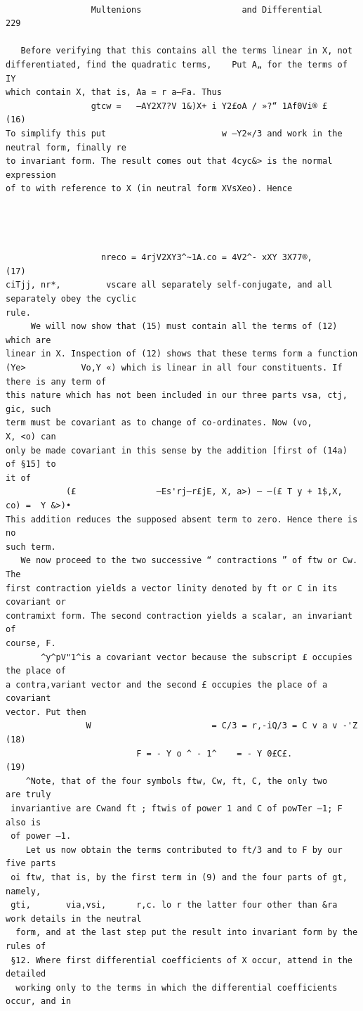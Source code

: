 \documentclass[10pt]{article}
\begin{document}
\clearpage
\begin{verbatim}

                 Multenions                    and Differential                  229

   Before verifying that this contains all the terms linear in X, not
differentiated, find the quadratic terms,    Put A„ for the terms of IY
which contain X, that is, Aa = r a—Fa. Thus
                 gtcw =   —AY2X7?V 1&)X+ i Y2£oA / »?“ 1Af0Vi® £                 (16)
To simplify this put                       w —Y2«/3 and work in the neutral form, finally re
to invariant form. The result comes out that 4cyc&> is the normal expression
of to with reference to X (in neutral form XVsXeo). Hence




                   nreco = 4rjV2XY3^~1A.co = 4V2^- xXY 3X77®,                    (17)
ciTjj, nr*,         vscare all separately self-conjugate, and all separately obey the cyclic
rule.
     We will now show that (15) must contain all the terms of (12) which are
linear in X. Inspection of (12) shows that these terms form a function
(Ye>           Vo,Y «) which is linear in all four constituents. If there is any term of
this nature which has not been included in our three parts vsa, ctj, gic, such
term must be covariant as to change of co-ordinates. Now (vo,                 X, <o) can
only be made covariant in this sense by the addition [first of (14a) of §15] to
it of
            (£                —Es'rj—r£jE, X, a>) — —(£ T y + 1$,X, co) =  Y &>)•
This addition reduces the supposed absent term to zero. Hence there is no
such term.
   We now proceed to the two successive “ contractions ” of ftw or Cw. The
first contraction yields a vector linity denoted by ft or C in its covariant or
contramixt form. The second contraction yields a scalar, an invariant of
course, F.
       ^y^pV"1^is a covariant vector because the subscript £ occupies the place of
a contra,variant vector and the second £ occupies the place of a covariant
vector. Put then
                W                        = C/3 = r,-iQ/3 = C v a v -'Z     (18)
                          F = - Y o ^ - 1^    = - Y 0£C£.                        (19)
    ^Note, that of the four symbols ftw, Cw, ft, C, the only two        are truly
 invariantive are Cwand ft ; ftwis of power 1 and C of powTer —1; F also is
 of power —1.
    Let us now obtain the terms contributed to ft/3 and to F by our five parts
 oi ftw, that is, by the first term in (9) and the four parts of gt, namely,
 gti,       via,vsi,      r,c. lo r the latter four other than &ra work details in the neutral
  form, and at the last step put the result into invariant form by the rules of
 §12. Where first differential coefficients of X occur, attend in the detailed
  working only to the terms in which the differential coefficients occur, and in


\end{verbatim}
\end{document}
